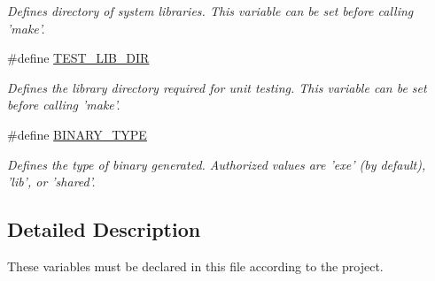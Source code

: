 \begin{DoxyCompactItemize}
\begin{DoxyCompactList}\small\item\em Defines directory of system libraries. This variable can be set before calling 'make'. \end{DoxyCompactList}\item 
\hypertarget{group___project___variables_gaff7229fc1fa8b5497265124671da29b2}{\#define \hyperlink{group___project___variables_gaff7229fc1fa8b5497265124671da29b2}{T\+E\+S\+T\+\_\+\+L\+I\+B\+\_\+\+D\+I\+R}}\label{group___project___variables_gaff7229fc1fa8b5497265124671da29b2}

\begin{DoxyCompactList}\small\item\em Defines the library directory required for unit testing. This variable can be set before calling 'make'. \end{DoxyCompactList}\item 
\hypertarget{group___project___variables_ga4784add1b0803628960f83525dadc73b}{\#define \hyperlink{group___project___variables_ga4784add1b0803628960f83525dadc73b}{B\+I\+N\+A\+R\+Y\+\_\+\+T\+Y\+P\+E}}\label{group___project___variables_ga4784add1b0803628960f83525dadc73b}

\begin{DoxyCompactList}\small\item\em Defines the type of binary generated. Authorized values are 'exe' (by default), 'lib', or 'shared'. \end{DoxyCompactList}\end{DoxyCompactItemize}


\subsection{Detailed Description}
These variables must be declared in this file according to the project. 

